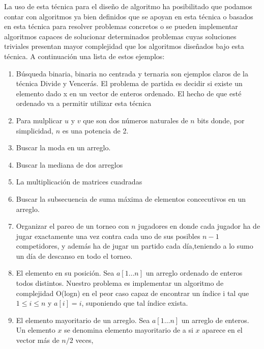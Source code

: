 La uso de esta técnica para el diseño de algoritmo ha posibilitado que podamos contar con algoritmos ya bien definidos que se apoyan en esta técnica o basados en esta técnica para resolver problemas concretos o se pueden implementar algoritmos capaces de solucionar determinados problemas cuyas soluciones triviales presentan mayor complejidad que los algoritmos diseñados bajo esta técnica. A continuación una lista de estos ejemplos:

\begin{enumerate}
	\item Búsqueda binaria, binaria no centrada y ternaria son ejemplos claros de la técnica Divide y
	Vencerás. El problema de partida es decidir si existe un elemento dado x en un
	vector de enteros ordenado. El hecho de que esté ordenado va a permitir utilizar
	esta técnica
	\item Para mulplicar  $u$ y $v$ que son dos números naturales de $n$ bits donde, por simplicidad, $n$ es una
potencia de 2. 
	\item Buscar la moda en un arreglo.
	\item Buscar la mediana de dos arreglos
	\item La multiplicación de matrices cuadradas
	\item Buscar la subsecuencia de suma máxima de elementos concecutivos en un arreglo.
	\item Organizar el pareo de un torneo con $n$ jugadores en donde cada jugador
	ha de jugar exactamente una vez contra cada uno de sus posibles $n-1$ competidores,
	y además ha de jugar un partido cada día,teniendo a lo sumo un día de descanso en
	todo el torneo.
	\item El elemento en su posición. Sea $a[1 \dots n]$ un arreglo ordenado de enteros todos distintos. Nuestro problema es implementar un algoritmo de complejidad O(logn) en el peor caso capaz de
encontrar un índice i tal que $1 \le i \le n$ y $a[i] = i$, suponiendo que tal índice exista.
	\item El elemento mayoritario de un arreglo. Sea $a[1 \dots n]$ un arreglo de enteros. Un elemento $x$ se denomina elemento mayoritario
de a si $x$ aparece en el vector más de $n/2$ veces,
\end{enumerate}  









